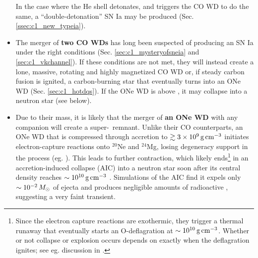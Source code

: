 \begin{itemize}



In the case where the He shell detonates, and triggers the CO WD to do the same, a ``double-detonation'' SN Ia may be produced (Sec. \ref{ssec:c1_new_typeia}).

	\item The merger of {\bf two CO WDs} has long been suspected of producing an SN Ia under the right conditions (Sec. \ref{sec:c1_mysteryofsneia} and \ref{sec:c1_vkchannel}).  If these conditions are not met, they will instead create a lone, massive, rotating and highly magnetized CO WD or, if steady carbon fusion is ignited, a carbon-burning star that eventually turns into an ONe WD (Sec. \ref{sec:c1_hotdqs}).  If the ONe WD is above \Mch, it may collapse into a neutron star (see below).

	\item Due to their mass, it is likely that the merger of {\bf an ONe WD} with any companion will create a super-\Mch\ remnant.  Unlike their CO counterparts, an ONe WD that is compressed through accretion to $\gtrsim3\times10^9\,\gcc$ initiates electron-capture reactions onto $^{20}$Ne and $^{24}$Mg, losing degeneracy support in the process (eg. \citealt{miya+80, saion85, schwqb15}).  This leads to further contraction, which likely ends\footnote{Since the electron capture reactions are exothermic, they trigger a thermal runaway that eventually starts an O-deflagration at $\sim10^{10}\,\gcc$.  Whether or not collapse or explosion occurs depends on exactly when the deflagration ignites; see eg. discussion in \cite{schwqb15}.} in an accretion-induced collapse (AIC) into a neutron star soon after its central density reaches $\sim10^{10}\,\gcc$ \citep{schwqb15}.  Simulations \citep{dess+06, dess+07, frye+09} of the AIC find it expels only $\sim10^{-2}\,\Msun$ of ejecta and produces negligible amounts of radioactive \Ni, suggesting a very faint transient.


\end{itemize}
